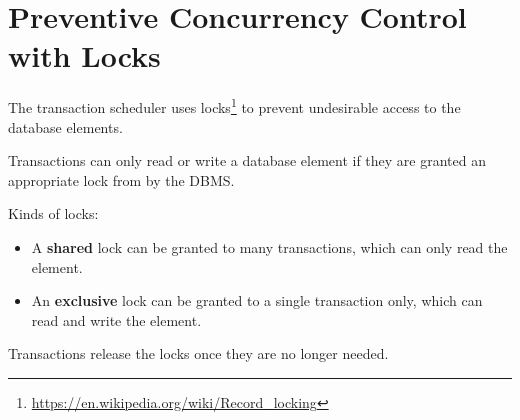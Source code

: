 %
%

\section{{Preventive Concurrency Control with Locks}}

\begin{frame}

The transaction scheduler uses locks\footnote{\url{https://en.wikipedia.org/wiki/Record_locking}} to prevent undesirable access to the database elements.

Transactions can only read or write a database element if they are granted an appropriate lock from by the DBMS.

Kinds of locks:
\begin{itemize}[-,noitemsep,topsep=-5pt]
\item A \textbf{shared} lock can be granted to many transactions, which can only read the element.
\item An \textbf{exclusive} lock can be granted to a single transaction only, which can read and write the element.
\end{itemize}

Transactions \alert{release the locks once they are no longer needed}.

\end{frame}




